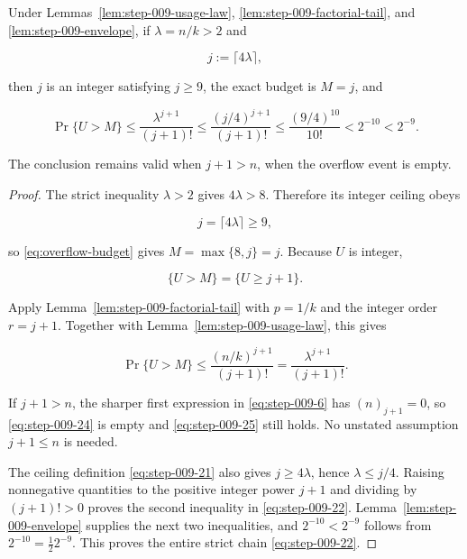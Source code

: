 \begin{lemma}\label{lem:step-009-large-mean}
Under Lemmas~\ref{lem:step-009-usage-law},
\ref{lem:step-009-factorial-tail}, and
\ref{lem:step-009-envelope}, if \(\lambda=n/k>2\) and

\[
j:=\lceil4\lambda\rceil,
\tag{S9.21}\label{eq:step-009-21}
\]

then \(j\) is an integer satisfying \(j\ge9\), the exact budget is
\(M=j\), and

\[
\Pr\{U>M\}
\le\frac{\lambda^{j+1}}{(j+1)!}
\le\frac{(j/4)^{j+1}}{(j+1)!}
\le\frac{(9/4)^{10}}{10!}
<2^{-10}<2^{-9}.
\tag{S9.22}\label{eq:step-009-22}
\]

The conclusion remains valid when \(j+1>n\), when the overflow event is
empty.
\end{lemma}

\begin{proof}
The strict inequality \(\lambda>2\) gives \(4\lambda>8\). Therefore its
integer ceiling obeys

\[
j=\lceil4\lambda\rceil\ge9,
\tag{S9.23}\label{eq:step-009-23}
\]

so \eqref{eq:overflow-budget} gives \(M=\max\{8,j\}=j\). Because \(U\) is integer,

\[
\{U>M\}=\{U\ge j+1\}.
\tag{S9.24}\label{eq:step-009-24}
\]

Apply Lemma~\ref{lem:step-009-factorial-tail} with
\(p=1/k\) and the integer order \(r=j+1\). Together with
Lemma~\ref{lem:step-009-usage-law}, this gives

\[
\Pr\{U>M\}
\le\frac{(n/k)^{j+1}}{(j+1)!}
=\frac{\lambda^{j+1}}{(j+1)!}.
\tag{S9.25}\label{eq:step-009-25}
\]

If \(j+1>n\), the sharper first expression in \eqref{eq:step-009-6} has
\((n)_{j+1}=0\), so \eqref{eq:step-009-24} is empty and \eqref{eq:step-009-25} still holds. No unstated
assumption \(j+1\le n\) is needed.

The ceiling definition \eqref{eq:step-009-21} also gives \(j\ge4\lambda\), hence
\(\lambda\le j/4\). Raising nonnegative quantities to the positive integer
power \(j+1\) and dividing by \((j+1)!>0\) proves the second inequality in
\eqref{eq:step-009-22}. Lemma~\ref{lem:step-009-envelope} supplies the next two inequalities,
and \(2^{-10}<2^{-9}\) follows from \(2^{-10}=\tfrac12 2^{-9}\).
This proves the entire strict chain \eqref{eq:step-009-22}. \end{proof}


